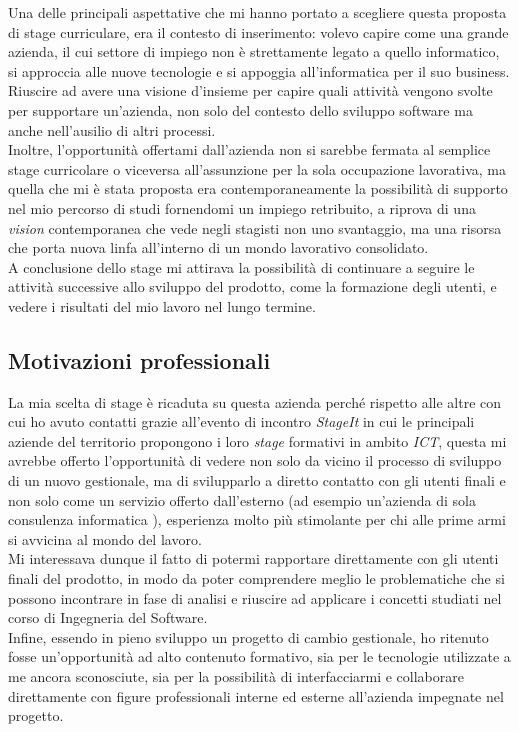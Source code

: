 Una delle principali aspettative che mi hanno portato a scegliere questa proposta di stage curriculare, era il contesto di inserimento: volevo capire come una grande azienda, il cui settore di impiego non è strettamente legato a quello informatico, si approccia alle nuove tecnologie e si appoggia all'informatica per il suo business. 
\\
Riuscire ad avere una visione d'insieme per capire quali attività vengono svolte per supportare un'azienda, non solo del contesto dello sviluppo software ma anche nell'ausilio di altri processi.
\\
Inoltre, l'opportunità offertami dall'azienda non si sarebbe fermata al semplice stage curricolare o viceversa all'assunzione per la sola occupazione lavorativa, ma quella che mi è stata proposta era contemporaneamente la possibilità di supporto nel mio percorso di studi fornendomi un impiego retribuito, a riprova di una \textit{vision} contemporanea che vede negli stagisti non uno svantaggio, ma una risorsa che porta nuova linfa all'interno di un mondo lavorativo consolidato.
\\
A conclusione dello stage mi attirava la possibilità di continuare a seguire le attività successive allo sviluppo del prodotto, come la formazione degli utenti, e vedere i risultati del mio lavoro nel lungo termine.

\subsection{Motivazioni professionali}

La mia scelta di stage è ricaduta su questa azienda perché rispetto alle altre con cui ho avuto contatti grazie all'evento di incontro \textit{StageIt} in cui le principali aziende del territorio propongono i loro \textit{stage} formativi in ambito \textit{ICT}, questa mi avrebbe offerto l'opportunità di vedere non solo da vicino il processo di sviluppo di un nuovo gestionale, ma di svilupparlo a diretto contatto con gli utenti finali e non solo come un servizio offerto dall'esterno (ad esempio un'azienda di sola consulenza informatica ), esperienza molto più stimolante per chi alle prime armi si avvicina al mondo del lavoro.
\\
Mi interessava dunque il fatto di potermi rapportare direttamente con gli utenti finali del prodotto, in modo da poter comprendere meglio le problematiche che si possono incontrare in fase di analisi e riuscire ad applicare i concetti studiati nel corso di Ingegneria del Software. 
\\ 
Infine, essendo in pieno sviluppo un progetto di cambio gestionale, ho ritenuto fosse un'opportunità ad alto contenuto formativo, sia per le tecnologie utilizzate a me ancora sconosciute, sia per la possibilità di interfacciarmi e collaborare direttamente con figure professionali interne ed esterne all'azienda impegnate nel progetto.
